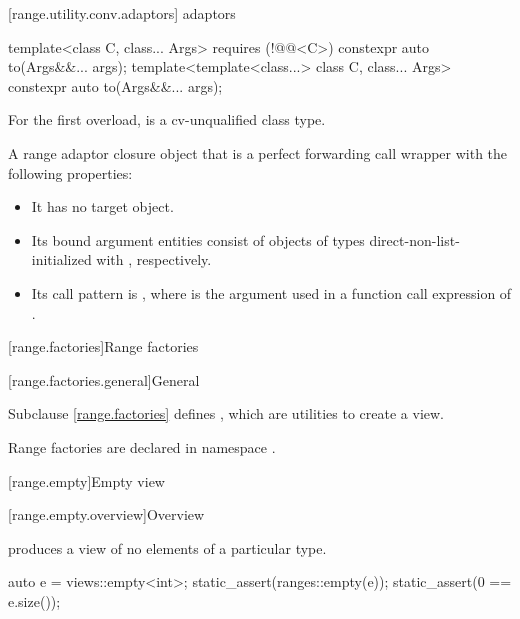 [range.utility.conv.adaptors]{ adaptors}

%
\begin{itemdecl}
template<class C, class... Args> requires (!@@<C>)
  constexpr auto to(Args&&... args);
template<template<class...> class C, class... Args>
  constexpr auto to(Args&&... args);
\end{itemdecl}

\begin{itemdescr}
\pnum
\mandates
For the first overload,
 is a cv-unqualified class type.

\pnum
\returns
A range adaptor closure object 
that is a perfect forwarding call wrapper
with the following properties:
\begin{itemize}
\item
It has no target object.
\item
Its bound argument entities  consist of
objects of types 
direct-non-list-initialized with ,
respectively.
\item
Its call pattern is ,
where  is the argument used in a function call expression of .
\end{itemize}
\end{itemdescr}

[range.factories]{Range factories}

[range.factories.general]{General}

\pnum
Subclause \ref{range.factories} defines ,
which are utilities to create a view.

\pnum
Range factories are declared in namespace .

[range.empty]{Empty view}

[range.empty.overview]{Overview}

\pnum
{} produces a view of no elements of
a particular type.

\pnum
\begin{example}
\begin{codeblock}
auto e = views::empty<int>;
static_assert(ranges::empty(e));
static_assert(0 == e.size());
\end{codeblock}
\end{example}

